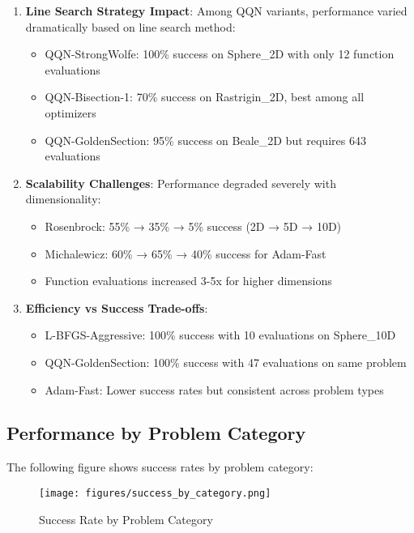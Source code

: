 \begin{enumerate}
\def\labelenumi{\arabic{enumi}.}
\tightlist
\item
  \textbf{Line Search Strategy Impact}: Among QQN variants, performance varied dramatically based on line search method:

  \begin{itemize}
  \tightlist
  \item
    QQN-StrongWolfe: 100\% success on Sphere\_2D with only 12 function evaluations
  \item
    QQN-Bisection-1: 70\% success on Rastrigin\_2D, best among all optimizers
  \item
    QQN-GoldenSection: 95\% success on Beale\_2D but requires 643 evaluations
  \end{itemize}
\item
  \textbf{Scalability Challenges}: Performance degraded severely with dimensionality:

  \begin{itemize}
  \tightlist
  \item
    Rosenbrock: 55\% → 35\% → 5\% success (2D → 5D → 10D)
  \item
    Michalewicz: 60\% → 65\% → 40\% success for Adam-Fast
  \item
    Function evaluations increased 3-5x for higher dimensions
  \end{itemize}
\item
  \textbf{Efficiency vs Success Trade-offs}:

  \begin{itemize}
  \tightlist
  \item
    L-BFGS-Aggressive: 100\% success with 10 evaluations on Sphere\_10D
  \item
    QQN-GoldenSection: 100\% success with 47 evaluations on same problem
  \item
    Adam-Fast: Lower success rates but consistent across problem types
  \end{itemize}
\end{enumerate}

\hypertarget{performance-by-problem-category}{%
\subsection{Performance by Problem Category}\label{performance-by-problem-category}}

The following figure shows success rates by problem category:

\begin{figure}
\centering
\texttt{[image: figures/success\_by\_category.png]}
\caption{Success Rate by Problem Category}
\end{figure}


